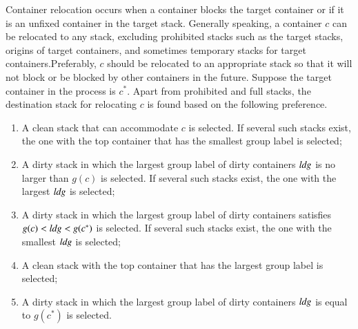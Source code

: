 \documentclass[review,3p,times,authoryear,12pt]{elsarticle}
\begin{document}
Container relocation occurs when a container blocks the target container or if it is an unfixed container in the target stack. Generally speaking, a container $c$ can be relocated to any stack, excluding prohibited stacks such as the target stacks, origins of target containers, and sometimes temporary stacks for target containers.Preferably, $c$ should be relocated to an appropriate stack so that it will not block or be blocked by other containers in the future. Suppose the target container in the process is $c^*$. Apart from prohibited and full stacks, the destination stack for relocating $c$ is found based on the following preference.
\begin{enumerate}[1.]
\item A clean stack that can accommodate $c$ is selected. If several such stacks exist, the one with the top container that has the smallest group label is selected;

\item A dirty stack in which the largest group label of dirty containers $\id{ldg}$ is no larger than $g(c)$ is selected. If several such stacks exist, the one with the largest $\id{ldg}$ is selected;

\item A dirty stack in which the largest group label of dirty containers  satisfies $g(c)<\id{ldg}<g(c^*)$ is selected. If several such stacks exist, the one with the smallest $\id{ldg}$ is selected;

\item A clean stack with the top container that has the largest group label is selected;

\item A dirty stack in which the largest group label of dirty containers $\id{ldg}$ is equal to $g(c^*)$ is selected.
\end{enumerate}
\end{document}
